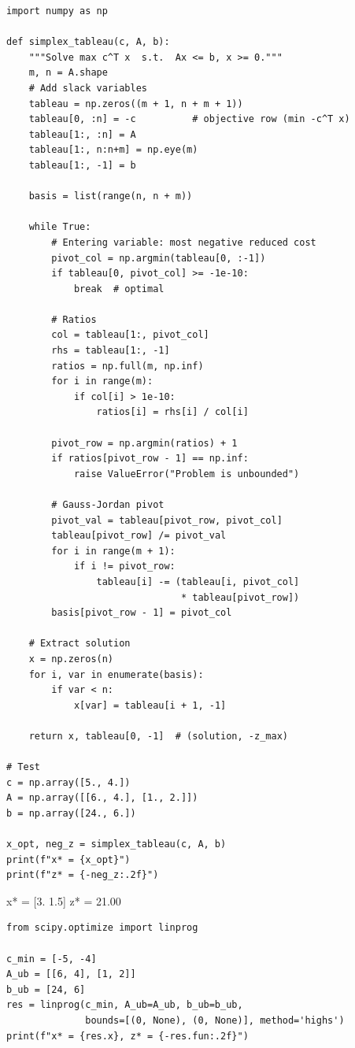 \begin{codeblock}[title=\textbf{Simplex tableau in Python}]
\begin{verbatim}
import numpy as np

def simplex_tableau(c, A, b):
    """Solve max c^T x  s.t.  Ax <= b, x >= 0."""
    m, n = A.shape
    # Add slack variables
    tableau = np.zeros((m + 1, n + m + 1))
    tableau[0, :n] = -c          # objective row (min -c^T x)
    tableau[1:, :n] = A
    tableau[1:, n:n+m] = np.eye(m)
    tableau[1:, -1] = b

    basis = list(range(n, n + m))

    while True:
        # Entering variable: most negative reduced cost
        pivot_col = np.argmin(tableau[0, :-1])
        if tableau[0, pivot_col] >= -1e-10:
            break  # optimal

        # Ratios
        col = tableau[1:, pivot_col]
        rhs = tableau[1:, -1]
        ratios = np.full(m, np.inf)
        for i in range(m):
            if col[i] > 1e-10:
                ratios[i] = rhs[i] / col[i]

        pivot_row = np.argmin(ratios) + 1
        if ratios[pivot_row - 1] == np.inf:
            raise ValueError("Problem is unbounded")

        # Gauss-Jordan pivot
        pivot_val = tableau[pivot_row, pivot_col]
        tableau[pivot_row] /= pivot_val
        for i in range(m + 1):
            if i != pivot_row:
                tableau[i] -= (tableau[i, pivot_col]
                               * tableau[pivot_row])
        basis[pivot_row - 1] = pivot_col

    # Extract solution
    x = np.zeros(n)
    for i, var in enumerate(basis):
        if var < n:
            x[var] = tableau[i + 1, -1]

    return x, tableau[0, -1]  # (solution, -z_max)

# Test
c = np.array([5., 4.])
A = np.array([[6., 4.], [1., 2.]])
b = np.array([24., 6.])

x_opt, neg_z = simplex_tableau(c, A, b)
print(f"x* = {x_opt}")
print(f"z* = {-neg_z:.2f}")
\end{verbatim}
\end{codeblock}

\begin{codeoutput}
x* = [3.  1.5]
z* = 21.00
\end{codeoutput}

\begin{codeblock}[title=\textbf{Verification with SciPy}]
\begin{verbatim}
from scipy.optimize import linprog

c_min = [-5, -4]
A_ub = [[6, 4], [1, 2]]
b_ub = [24, 6]
res = linprog(c_min, A_ub=A_ub, b_ub=b_ub,
              bounds=[(0, None), (0, None)], method='highs')
print(f"x* = {res.x}, z* = {-res.fun:.2f}")
\end{verbatim}
\end{codeblock}

